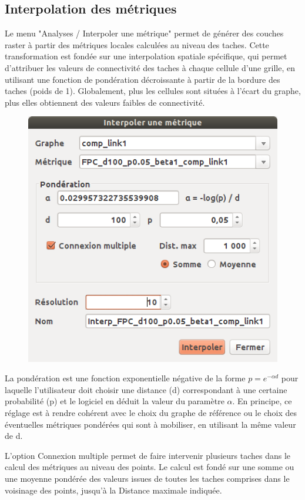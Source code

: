 \documentclass{article}
\begin{document}
\subsection{Interpolation des métriques}

Le menu "Analyses / Interpoler une métrique" permet de générer des couches raster à partir des métriques locales calculées au niveau des taches. Cette transformation est fondée sur une interpolation spatiale spécifique, qui permet d’attribuer les valeurs de connectivité des taches à chaque cellule d’une grille, en utilisant une fonction de pondération décroissante à partir de la bordure des taches (poids de 1). Globalement, plus les cellules sont situées à l’écart du graphe, plus elles obtiennent des valeurs faibles de connectivité.

\begin{figure}[H]
	\includegraphics[scale=0.5]{img/manual-fr_img12.png} 
\end{figure}

La pondération est une fonction exponentielle négative de la forme  $p={e}^{-\mathit{\alpha d}}$ pour laquelle l’utilisateur doit choisir une distance (d) correspondant à une certaine probabilité (p) et le logiciel en déduit la valeur du paramètre $\alpha $. En principe, ce réglage est à rendre cohérent avec le choix du graphe de référence ou le choix des éventuelles métriques pondérées qui sont à mobiliser, en utilisant la même valeur de d.

L’option Connexion multiple permet de faire intervenir plusieurs taches dans le calcul des métriques au niveau des points. Le calcul est fondé sur une somme ou une moyenne pondérée des valeurs issues de toutes les taches comprises dans le voisinage des points, jusqu’à la Distance maximale indiquée.
\end{document}
